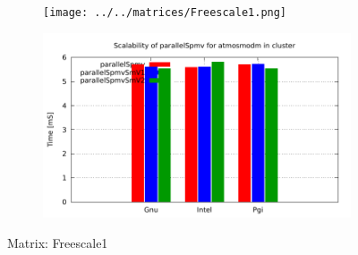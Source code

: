 \begin{figure} [ht!]
    \centering
    \captionsetup{justification=centering, singlelinecheck=false}
    \begin{subfigure}{.65\textwidth}
      \centering
      \hspace*{-3.5cm} 
      \texttt{[image: ../../matrices/Freescale1.png]}
      \label{fig:Freescale1_matrix}
    \end{subfigure}%
    \begin{subfigure}{.65\textwidth}
      \centering
      \hspace*{-6.0cm} 
      \includegraphics[page=3, width=0.95\linewidth]{../plots/myCluster_4-2.pdf}
      \label{fig:Freescale1_performance}
    \end{subfigure}
\caption{Matrix: Freescale1}
\label{fig:Freescale1}
\end{figure}

